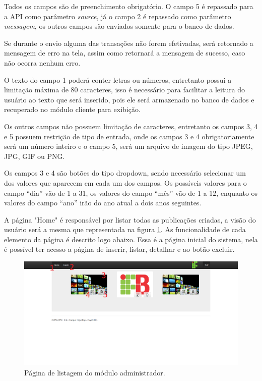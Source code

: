Todos os campos são de preenchimento obrigatório. O campo 5 é repassado para a API como parâmetro \textit{source}, já o campo 2 é repassado como parâmetro \textit{messagem}, os outros campos são enviados somente para o banco de dados.

Se durante o envio alguma das transações não forem efetivadas, será retornado a mensagem de erro na tela, assim como retornará a mensagem de sucesso, caso não ocorra nenhum erro.

O texto do campo 1 poderá conter letras ou números, entretanto possui a limitação máxima de 80 caracteres, isso é necessário para facilitar a leitura do usuário ao texto que será inserido, pois ele será armazenado no banco de dados e recuperado no módulo cliente para exibição.

Os outros campos não possuem limitação de caracteres, entretanto os campos 3, 4 e 5 possuem restrição de tipo de entrada, onde os campos 3 e 4 obrigatoriamente será um número inteiro e o campo 5, será um arquivo de imagem do tipo JPEG, JPG, GIF ou PNG.

Os campos 3 e 4 são botões do tipo dropdown, sendo necessário selecionar um dos valores que aparecem em cada um dos campos. Os possíveis valores para o campo ``dia'' vão de 1 a 31, os valores do campo ``mês'' vão de 1 a 12, enquanto os valores do campo ``ano'' irão do ano atual a dois anos seguintes.

A página "Home" é responsável por listar todas as publicações criadas, a visão do usuário será a mesma que representada na figura \ref{fig:administrador2}. As funcionalidade de cada elemento da página é descrito logo abaixo. Essa é a página inicial do sistema, nela é possível ter acesso a página de inserir, listar, detalhar e ao botão excluir.

\begin{figure}[H]
\centering
\includegraphics[scale=0.4]{figuras/administrador2}
\caption{Página de listagem  do módulo administrador.}
\label{fig:administrador2}
\end{figure}

